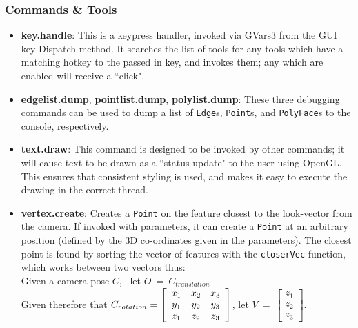 \documentclass[a4paper,10pt]{article}
\begin{document}
\subsubsection{Commands \& Tools}
\begin{itemize}
\item{\textbf{key.handle}: This is a keypress handler, invoked via GVars3 from the GUI key Dispatch method. It searches the list of tools for any tools which have a matching hotkey to the passed in key, and invokes them; any which are enabled will receive a ``click".}
\item{\textbf{edgelist.dump}, \textbf{pointlist.dump}, \textbf{polylist.dump}: These three debugging commands can be used to dump a list of \texttt{Edge}s, \texttt{Point}s, and \texttt{PolyFace}s to the console, respectively.}
\item{\textbf{text.draw}: This command is designed to be invoked by other commands; it will cause text to be drawn as a ``status update" to the user using OpenGL. This ensures that consistent styling is used, and makes it easy to execute the drawing in the correct thread.}
\item{\textbf{vertex.create}: Creates a \texttt{Point} on the feature closest to the look-vector from the camera. If invoked with parameters, it can create a \texttt{Point} at an arbitrary position (defined by the 3D co-ordinates given in the parameters). The closest point is found by sorting the vector of features with the \texttt{closerVec} function, which works between two vectors thus: 
\\

Given a camera pose $C$, ~let $O ~=~ C_{translation}$
\\

Given therefore that $C_{rotation} = \left[
  \begin{array}{c c c}
    x_1 & x_2 & x_3 \\
    y_1 & y_2 & y_3 \\
    z_1 & z_2 & z_3
  \end{array}\right]$, let $V ~=~ \left[ 
  \begin{array}{c}
    z_1 \\ 
    z_2 \\ 
    z_3 
  \end{array}\right]$.
\\ \\
  
}
\end{itemize}
\end{document}
